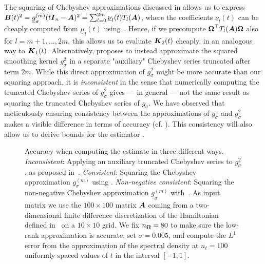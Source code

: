 The squaring of Chebyshev approximations discussed in  allows us to express $\boldsymbol{B}(t)^2 = \underline{g}_{\sigma}^{(m)}(t \boldsymbol{I}_n - \boldsymbol{A})^2 = \sum_{l=0}^{2m} \underline{\nu}_l(t) T_l(\boldsymbol{A})$, where the coefficients $\underline{\nu}_l(t)$ can be cheaply computed from $\underline{\mu}_l(t)$ using~. Hence, if we precompute
$\boldsymbol{\Omega}^{\top} T_l(\boldsymbol{A}) \boldsymbol{\Omega}$
also for $l=m+1, \dots, 2m$, this allows us to evaluate $\boldsymbol{K}_2(t)$ cheaply, in an analogous way to $\boldsymbol{K}_1(t)$. Alternatively, \cite{lin-2017-randomized-estimation} proposes to instead approximate the squared smoothing kernel $g_{\sigma}^2$ in a separate "auxiliary" Chebyshev series truncated after term $2m$. While this direct approximation of $g_{\sigma}^2$ might be more accurate than our squaring approach, it is \emph{inconsistent} in the sense that numerically computing the truncated Chebyshev series of $g_{\sigma}^2$ gives --- in general --- not the same result as squaring the truncated Chebyshev series of $g_{\sigma}$. We have observed that meticulously ensuring consistency between the approximations of $g_{\sigma}$ and $g_{\sigma}^2$ makes a visible difference in terms of accuracy (cf. ). This consistency will also allow us to derive bounds for the estimator .
\begin{figure}[ht]
    \centering
    
    \caption{Accuracy when computing the estimate  in three different ways. \emph{Inconsistent}: Applying an auxiliary truncated Chebyshev series to $g_{\sigma}^2$, as proposed in~\cite{lin-2017-randomized-estimation}. \emph{Consistent}: Squaring the Chebyshev approximation $g_{\sigma}^{(m)}$ using . \emph{Non-negative consistent}: Squaring the non-negative Chebyshev approximation $\underline{g}_{\sigma}^{(m)}$ with~. As input matrix we use the $100 \times 100$ matrix $\boldsymbol{A}$ coming from a two-dimensional finite difference discretization of the Hamiltonian defined in~ on a $10 \times 10$ grid. We fix $n_{\boldsymbol{\Omega}} = 80$ to make sure the low-rank approximation is accurate, set $\sigma = 0.005$, and compute the $L^1$ error from the approximation of the spectral density at $n_t = 100$ uniformly spaced values of $t$ in the interval $[-1, 1]$.}
    \label{fig:interpolation-issue}
\end{figure}

